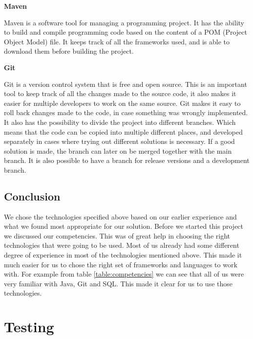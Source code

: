 \textbf{Maven} \nocite{Maven}

Maven is a software tool for managing a programming project.
It has the ability to build and compile programming code based on the content of a POM (Project Object Model) file.
It keeps track of all the frameworks used, and is able to download them before building the project.

\textbf{Git} \nocite{Git}

Git is a version control system that is free and open source.
This is an important tool to keep track of all the changes made to the source code, it also makes it easier for multiple developers to work on the same source.
Git makes it easy to roll back changes made to the code, in case something was wrongly implemented.
It also has the possibility to divide the project into different branches.
Which means that the code can be copied into multiple different places, and developed separately in cases where trying out different solutions is necessary.
If a good solution is made, the branch can later on be merged together with the main branch.
It is also possible to have a branch for release versions and a development branch.

\subsection{Conclusion}

We chose the technologies specified above based on our earlier experience and what we found most appropriate for our solution.
Before we started this project we discussed our competencies.
This was of great help in choosing the right technologies that were going to be used.
Most of us already had some different degree of experience in most of the technologies mentioned above.
This made it much easier for us to chose the right set of frameworks and languages to work with.
For example from table \ref{table:competencies} we can see that all of us were very familiar with Java, Git and SQL.
This made it clear for us to use those technologies.

\section{Testing}
\label{section:testing}

